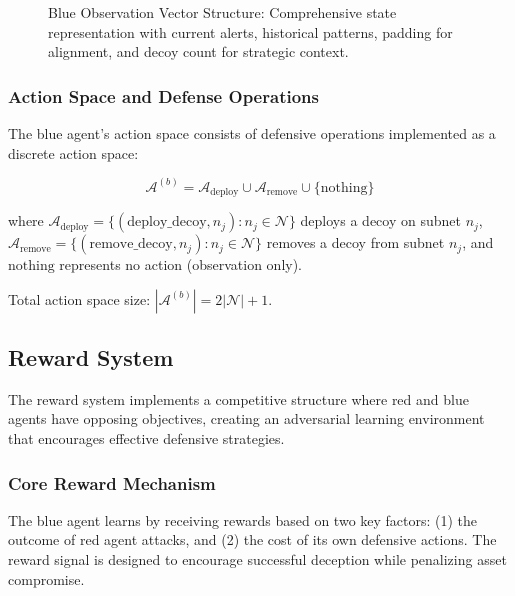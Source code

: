 \documentclass[12pt,oneside]{article}
\begin{document}
\begin{figure}[htbp]
\caption{Blue Observation Vector Structure: Comprehensive state representation with current alerts, historical patterns, padding for alignment, and decoy count for strategic context.}
\label{fig:observation_vector}
\end{figure}

\subsubsection{Action Space and Defense Operations}

The blue agent's action space consists of defensive operations implemented as a discrete action space:

\begin{equation}
\mathcal{A}^{(b)} = \mathcal{A}_{\text{deploy}} \cup \mathcal{A}_{\text{remove}} \cup \{\text{nothing}\}
\end{equation}

where $\mathcal{A}_{\text{deploy}} = \{(\text{deploy\_decoy}, n_j) : n_j \in \mathcal{N}\}$ deploys a decoy on subnet $n_j$, $\mathcal{A}_{\text{remove}} = \{(\text{remove\_decoy}, n_j) : n_j \in \mathcal{N}\}$ removes a decoy from subnet $n_j$, and $\text{nothing}$ represents no action (observation only).

Total action space size: $|\mathcal{A}^{(b)}| = 2|\mathcal{N}| + 1$.

\subsection{Reward System}

The reward system implements a competitive structure where red and blue agents have opposing objectives, creating an adversarial learning environment that encourages effective defensive strategies.

\subsubsection{Core Reward Mechanism}

The blue agent learns by receiving rewards based on two key factors: (1) the outcome of red agent attacks, and (2) the cost of its own defensive actions. The reward signal is designed to encourage successful deception while penalizing asset compromise.
\end{document}
